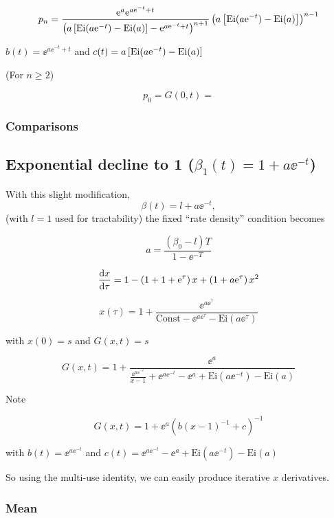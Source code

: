 $$p_n   =  \frac{ {\rm e}^a {\rm e}^{a {\rm e}^{-t} + t } }{   \left( a\left[   \text{Ei}(a{\rm e}^{-t})  - \text{Ei}(a)  \right]      -    {\rm e}^{a {\rm e}^{-t} + t }\right)^{n+1}   }   \left( a\left[   \text{Ei}(a{\rm e}^{-t})  - \text{Ei}(a)  \right]  \right)^{n-1}$$


 $b(t) = \ee^{a \ee^{-t} + t } $ and $c(t) =  a\left[   \text{Ei}(a{\rm e}^{-t})  - \text{Ei}(a)  \right]   $
 
 
 (For $n\geq 2$)
 
 
 $$p_0 = G(0,t) = $$



\subsubsection{Comparisons}













\subsection{Exponential decline to 1 ($\beta_1(t) = 1 +  a\ee^{-t}$)}

With this slight modification, 
$$\beta(t) = l + a\ee^{-t},$$
(with $l = 1$ used for tractability) the fixed ``rate density'' condition becomes

$$a = \frac{(\beta_0 - l)T}{1-\ee^{-T}}$$


$$\displaystyle\frac{{\rm d} x}{{\rm d} \tau} = 1 - \left(1 + 1+ {\rm e}^\tau\right) x + \left(1 + a{\rm e}^{\tau}\right) x^2$$

$$x(\tau) = 1 + \frac{\ee^{a\ee^\tau}}{  \text{Const}  - \ee^{a\ee^{\tau}}  - \text{Ei}(a\ee^\tau)  }$$

with $x(0) = s$ and $G(x,t) = s$

$$G(x,t)  = 1 + \frac{\ee^a}{     \frac{\ee^{a \ee^{-t}}}{x-1}     +  \ee^{a \ee^{-t}} - \ee^a + \text{Ei}(a\ee^{-t})    - \text{Ei}(a)      } $$


Note

$$G(x,t) = 1 + \ee^a(b(x-1)^{-1} + c)^{-1}$$

with $b(t) = \ee^{a\ee^{-t}}$ and $c(t) = \ee^{a \ee^{-t}} - \ee^a + \text{Ei}(a\ee^{-t})    - \text{Ei}(a)  $

So using the multi-use identity, we can easily produce iterative $x$ derivatives. 




\subsubsection{Mean}


